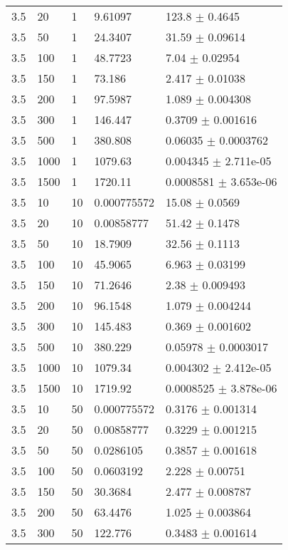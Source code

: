 \begin{longtable}{lllll}
 3.5 &    20 &     1 &  9.61097 &    123.8 $\pm$   0.4645 \\
 3.5 &    50 &     1 &  24.3407 &    31.59 $\pm$  0.09614 \\
 3.5 &   100 &     1 &  48.7723 &     7.04 $\pm$  0.02954 \\
 3.5 &   150 &     1 &   73.186 &    2.417 $\pm$  0.01038 \\
 3.5 &   200 &     1 &  97.5987 &    1.089 $\pm$ 0.004308 \\
 3.5 &   300 &     1 &  146.447 &   0.3709 $\pm$ 0.001616 \\
 3.5 &   500 &     1 &  380.808 &  0.06035 $\pm$ 0.0003762 \\
 3.5 &  1000 &     1 &  1079.63 & 0.004345 $\pm$ 2.711e-05 \\
 3.5 &  1500 &     1 &  1720.11 & 0.0008581 $\pm$ 3.653e-06 \\
 3.5 &    10 &    10 & 0.000775572 &    15.08 $\pm$   0.0569 \\
 3.5 &    20 &    10 & 0.00858777 &    51.42 $\pm$   0.1478 \\
 3.5 &    50 &    10 &  18.7909 &    32.56 $\pm$   0.1113 \\
 3.5 &   100 &    10 &  45.9065 &    6.963 $\pm$  0.03199 \\
 3.5 &   150 &    10 &  71.2646 &     2.38 $\pm$ 0.009493 \\
 3.5 &   200 &    10 &  96.1548 &    1.079 $\pm$ 0.004244 \\
 3.5 &   300 &    10 &  145.483 &    0.369 $\pm$ 0.001602 \\
 3.5 &   500 &    10 &  380.229 &  0.05978 $\pm$ 0.0003017 \\
 3.5 &  1000 &    10 &  1079.34 & 0.004302 $\pm$ 2.412e-05 \\
 3.5 &  1500 &    10 &  1719.92 & 0.0008525 $\pm$ 3.878e-06 \\
 3.5 &    10 &    50 & 0.000775572 &   0.3176 $\pm$ 0.001314 \\
 3.5 &    20 &    50 & 0.00858777 &   0.3229 $\pm$ 0.001215 \\
 3.5 &    50 &    50 & 0.0286105 &   0.3857 $\pm$ 0.001618 \\
 3.5 &   100 &    50 & 0.0603192 &    2.228 $\pm$  0.00751 \\
 3.5 &   150 &    50 &  30.3684 &    2.477 $\pm$ 0.008787 \\
 3.5 &   200 &    50 &  63.4476 &    1.025 $\pm$ 0.003864 \\
 3.5 &   300 &    50 &  122.776 &   0.3483 $\pm$ 0.001614 \\

\end{longtable}
